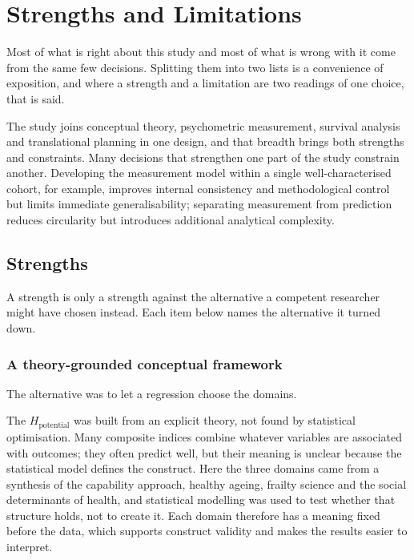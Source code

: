\section{Strengths and Limitations}
\label{sec:disc-strengths-limitations}

\noindent Most of what is right about this study and most of what is wrong with
it come from the same few decisions. Splitting them into two lists is a
convenience of exposition, and where a strength and a limitation are two readings
of one choice, that is said.

\noindent The study joins conceptual theory, psychometric measurement, survival analysis and translational planning in one design, and that breadth brings both strengths and constraints. Many decisions that strengthen one part of the study constrain another. Developing the measurement model within a single well-characterised cohort, for example, improves internal consistency and methodological control but limits immediate generalisability; separating measurement from prediction reduces circularity but introduces additional analytical complexity.

\subsection{Strengths}
\label{sec:disc-strengths}

A strength is only a strength against the alternative a competent researcher
might have chosen instead. Each item below names the alternative it turned down.

\subsubsection{A theory-grounded conceptual framework}

The alternative was to let a regression choose the domains.

The $H_{\text{potential}}$ was built from an explicit theory, not found by statistical optimisation. Many composite indices combine whatever variables are associated with outcomes; they often predict well, but their meaning is unclear because the statistical model defines the construct. Here the three domains came from a synthesis of the capability approach, healthy ageing, frailty science and the social determinants of health, and statistical modelling was used to test whether that structure holds, not to create it. Each domain therefore has a meaning fixed before the data, which supports construct validity and makes the results easier to interpret.

